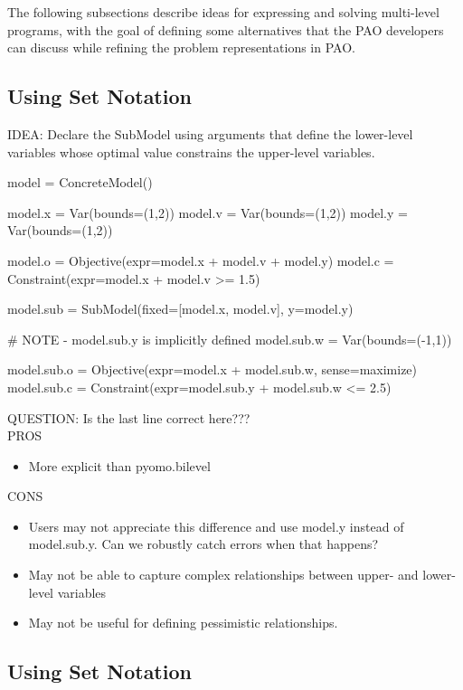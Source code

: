 The following subsections describe ideas for expressing and solving multi-level programs, with the
goal of defining some alternatives that the PAO developers can discuss while refining the 
problem representations in PAO.

\subsection{Using Set Notation}

IDEA: Declare the SubModel using arguments that define the lower-level variables whose
optimal value constrains the upper-level variables.

\begin{qlisting}
model = ConcreteModel()

model.x = Var(bounds=(1,2))
model.v = Var(bounds=(1,2))
model.y = Var(bounds=(1,2))

model.o = Objective(expr=model.x + model.v + model.y)
model.c = Constraint(expr=model.x + model.v >= 1.5)

model.sub = SubModel(fixed=[model.x, model.v], y=model.y)

# NOTE - model.sub.y is implicitly defined
model.sub.w = Var(bounds=(-1,1))

model.sub.o = Objective(expr=model.x + model.sub.w, sense=maximize)
model.sub.c = Constraint(expr=model.sub.y + model.sub.w <= 2.5)
\end{qlisting}
QUESTION: Is the last line correct here???\\

\noindent PROS
\begin{itemize}
\item More explicit than pyomo.bilevel
\end{itemize}
CONS
\begin{itemize}
\item Users may not appreciate this difference and use model.y instead of model.sub.y.  Can we robustly catch errors when that happens?
\item May not be able to capture complex relationships between upper- and lower-level variables
\item May not be useful for defining pessimistic relationships.
\end{itemize}


\subsection{Using Set Notation}

